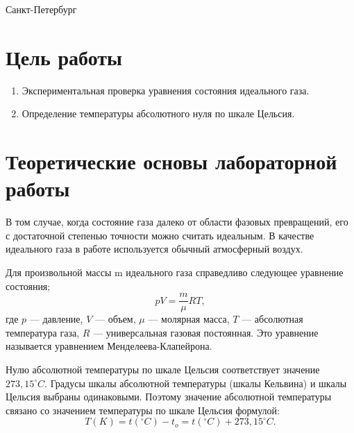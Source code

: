 \documentclass[12pt]{article}
\begin{document}
\par\bigskip\par\bigskip\par\bigskip\par\bigskip\par\bigskip\par\bigskip\par\bigskip\par\bigskip\par\bigskip\par\bigskip     
\begin{center}
\large
Санкт-Петербург
\par{}
\end{center}
\newpage

\section*{Цель работы}
\begin{enumerate}
\item Экспериментальная проверка уравнения состояния идеального газа.
\item Определение температуры абсолютного нуля по шкале Цельсия.
\end{enumerate}
\section*{Теоретические основы лабораторной работы}

В том случае, когда состояние  газа далеко от области фазовых превращений, его с достаточной  степенью точности можно считать идеальным. В качестве идеального газа в работе используется  обычный атмосферный воздух.

Для произвольной массы m идеального газа справедливо следующее уравнение состояния;
\begin{equation}
pV = \frac{m}{\mu}RT,
\end{equation}	 	
где $p$ --- давление, $V$ --- объем, $\mu$ --- молярная масса, $T$ --- абсолютная температура газа, $R$ --- универсальная  газовая  постоянная.
Это  уравнение  называется уравнением Менделеева-Клапейрона. 

Нулю абсолютной температуры по шкале Цельсия соответствует значение $273,15 ^{\circ}C$. Градусы шкалы абсолютной температуры (шкалы Кельвина) и шкалы Цельсия выбраны одинаковыми. Поэтому значение абсолютной температуры связано со значением температуры по шкале Цельсия формулой:
\begin{equation}
T(K) = t(^{\circ} C) - t_{o}=t(^{\circ}C)+273,15 ^{\circ}C.
\end{equation}
\end{document}
